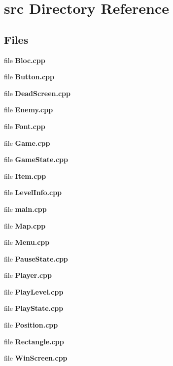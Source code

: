 \section{src Directory Reference}
\label{dir_68267d1309a1af8e8297ef4c3efbcdba}
\subsection*{Files}
\begin{DoxyCompactItemize}
\item 
file \textbf{ Bloc.\+cpp}
\item 
file \textbf{ Button.\+cpp}
\item 
file \textbf{ Dead\+Screen.\+cpp}
\item 
file \textbf{ Enemy.\+cpp}
\item 
file \textbf{ Font.\+cpp}
\item 
file \textbf{ Game.\+cpp}
\item 
file \textbf{ Game\+State.\+cpp}
\item 
file \textbf{ Item.\+cpp}
\item 
file \textbf{ Level\+Info.\+cpp}
\item 
file \textbf{ main.\+cpp}
\item 
file \textbf{ Map.\+cpp}
\item 
file \textbf{ Menu.\+cpp}
\item 
file \textbf{ Pause\+State.\+cpp}
\item 
file \textbf{ Player.\+cpp}
\item 
file \textbf{ Play\+Level.\+cpp}
\item 
file \textbf{ Play\+State.\+cpp}
\item 
file \textbf{ Position.\+cpp}
\item 
file \textbf{ Rectangle.\+cpp}
\item 
file \textbf{ Win\+Screen.\+cpp}
\end{DoxyCompactItemize}
